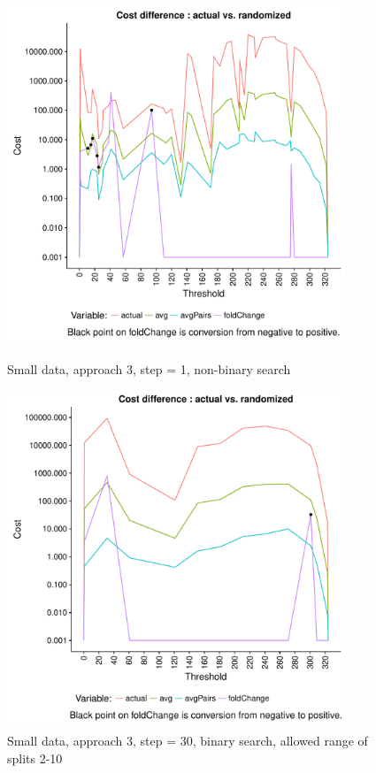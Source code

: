 \documentclass[a4paper,10pt]{article}
\theoremstyle{plain}
\theoremstyle{definition}
\begin{document}
\begin{figure}[H]
	\centering
	\begin{minipage}{0.80\textwidth}
		\centering
		\includegraphics[width=0.9\textwidth]{./plots/plotCostGap/plotCostGapSmallDataAp3Step1K5Seed21NoBinary.pdf}
		\caption{Small data, approach 3, step = 1, non-binary search}
		\label{fig:hcMaxGapSmallDataAp3Step1NoBinary}
	\end{minipage}
	\begin{minipage}{0.80\textwidth}
		\centering
		\includegraphics[width=0.9\textwidth]{./plots/plotCostGap/plotCostGapSmallDataAp3Step30K5Seed7Binary.pdf}
		\caption{Small data, approach 3, step = 30, binary search, allowed range of splits 2-10}
		\label{fig:hcMaxGapSmallDataAp3Step30Binary}
	\end{minipage}
\end{figure}
\end{document}
